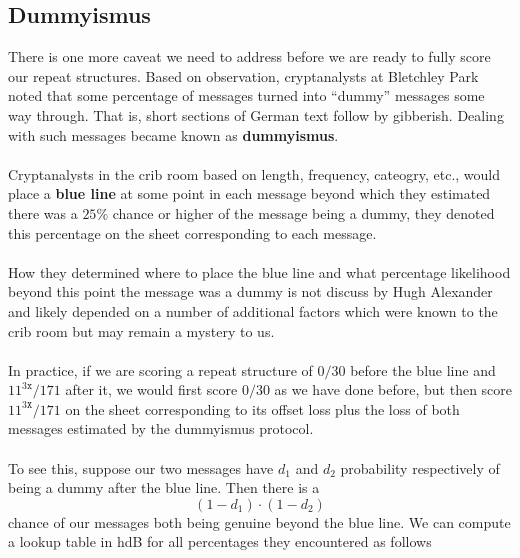   \subsection{Dummyismus}
  There is one more caveat we need to address before we are ready to
  fully score our repeat structures. Based on observation,
  cryptanalysts at Bletchley Park noted that some percentage of
  messages turned into ``dummy'' messages some way through. That is,
  short sections of German text follow by gibberish. Dealing with
  such messages became known as {\bf{dummyismus}}.
  \\\\Cryptanalysts in the crib room  based on length, frequency,
  cateogry, etc., would place a {\bf{blue line}} at some point in
  each message beyond which they estimated there was a $25\%$ chance
  or higher of the message being a dummy, they denoted this
  percentage on the sheet corresponding to each message.
  \\\\How they determined where to place the blue line and what
  percentage likelihood beyond this point the message was a dummy is
  not discuss by Hugh Alexander and likely depended on a number of
  additional factors which were known to the crib room but may remain
  a mystery to us.
  \\\\In practice, if we are scoring a repeat structure of $0/30$
  before the blue line and $11^{3\texttt{x}}/171$ after it, we would
  first score $0/30$ as we have done before, but then score
  $11^{3\texttt{X}}/171$ on the sheet corresponding to its offset
  loss plus the loss of both messages estimated by the dummyismus protocol.
  \\\\To see this, suppose our two messages have $d_1$ and $d_2$
  probability respectively of being a dummy after the blue line. Then there is a
  \[
    (1-d_1)\cdot(1-d_2)
  \]
  chance of our messages both being genuine beyond the blue line. We
  can compute a lookup table in hdB for all percentages they
  encountered as follows

